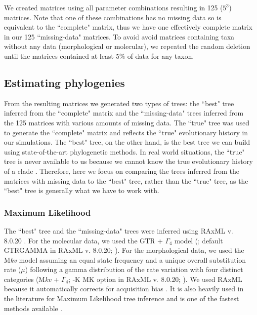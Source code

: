 \documentclass[12pt,letterpaper]{article}
\begin{document}
We created matrices using all parameter combinations resulting in 125 ($5^3$) matrices.
Note that one of these combinations has no missing data so is equivalent to the ``complete" matrix, thus we have one effectively complete matrix in our 125 ``missing-data" matrices.
To avoid avoid matrices containing taxa without any data (morphological or molecular), we repeated the random deletion until the matrices contained at least 5\% of data for any taxon.


\subsection{Estimating phylogenies}
From the resulting matrices we generated two types of trees: the ``best" tree inferred from the ``complete" matrix and the ``missing-data" trees inferred from the 125 matrices with various amounts of missing data.
The ``true" tree was used to generate the ``complete" matrix and reflects the ``true" evolutionary history in our simulations.
The ``best" tree, on the other hand, is the best tree we can build using state-of-the-art phylogenetic methods.
In real world situations, the ``true" tree is never available to us because we cannot know the true evolutionary history of a clade \citep[except in very rare circumstances, e.g.][]{rozen2005}.
Therefore, here we focus on comparing the trees inferred from the matrices with missing data to the ``best" tree, rather than the ``true" tree, as the ``best" tree is generally what we have to work with.

\subsubsection{Maximum Likelihood}
The ``best" tree and the ``missing-data" trees were inferred using RAxML v. 8.0.20 \citep{Stamatakis21012014}. For the molecular data, we used the GTR + $\Gamma_4$ model (\citealp{tavare1986}; default GTRGAMMA in RAxML v. 8.0.20; \citealp{Stamatakis21012014}).
For the morphological data, we used the M\textit{kv} model \citep{lewisa2001} assuming an equal state frequency and a unique overall substitution rate ($\mu$) following a gamma distribution of the rate variation with four distinct categories (M\textit{kv} + $\Gamma_4$; -K MK option in RAxML v. 8.0.20; \citealp{Stamatakis21012014}).
We used RAxML because it automatically corrects for acquisition bias \citep{lewisa2001}. It is also heavily used in the literature for Maximum Likelihood tree inference \citep[e.g.][]{rouresite-specific2011,Bogdanowicz2012,springermacroevolutionary2012,O'Leary08022013,kellymolecular2014} and is one of the fastest methods available \citep{Stamatakis01102008}. 
\end{document}
